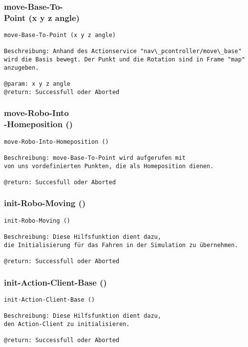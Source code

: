 \documentclass{suturo}
\begin{document}
\subsubsection{move-Base-To-\\
Point (x y z angle)}
\begin{verbatim}
move-Base-To-Point (x y z angle)

Beschreibung: Anhand des Actionservice "nav\_pcontroller/move\_base" 
wird die Basis bewegt. Der Punkt und die Rotation sind in Frame "map" anzugeben.

@param: x y z angle
@return: Successfull oder Aborted
\end{verbatim}


\subsubsection{move-Robo-Into\\
-Homeposition ()}
\begin{verbatim}
move-Robo-Into-Homeposition ()

Beschreibung: move-Base-To-Point wird aufgerufen mit 
von uns vordefinierten Punkten, die als Homeposition dienen.

@return: Succesfull oder Aborted
\end{verbatim}


\subsubsection{init-Robo-Moving ()}
\begin{verbatim}
init-Robo-Moving ()

Beschreibung: Diese Hilfsfunktion dient dazu,
die Initialisierung für das Fahren in der Simulation zu übernehmen.

@return: Successfull oder Aborted
\end{verbatim}

\subsubsection{init-Action-Client-Base ()}
\begin{verbatim}
init-Action-Client-Base ()

Beschreibung: Diese Hilfsfunktion dient dazu, 
den Action-Client zu initialisieren.

@return: Successfull oder Aborted
\end{verbatim}
\end{document}
